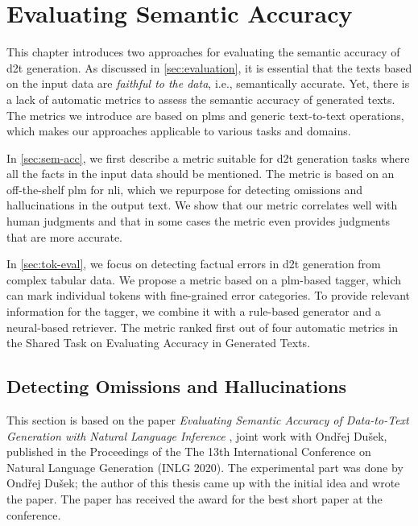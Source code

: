 
\chapter{Evaluating Semantic Accuracy}
\label{chap:evaluation}


This chapter introduces two approaches for evaluating the semantic accuracy of \ac{d2t} generation. As discussed in \autoref{sec:evaluation}, it is essential that the texts based on the input data are \emph{faithful to the data}, i.e., semantically accurate. Yet, there is a lack of automatic metrics to assess the semantic accuracy of generated texts. The metrics we introduce are based on \acp{plm} and generic text-to-text operations, which makes our approaches applicable to various tasks and domains.

In \autoref{sec:sem-acc}, we first describe a metric suitable for \ac{d2t} generation tasks where all the facts in the input data should be mentioned. The metric is based on an off-the-shelf \ac{plm} for \ac{nli}, which we repurpose for detecting omissions and hallucinations in the output text. We show that our metric correlates well with human judgments and that in some cases the metric even provides judgments that are more accurate.

In \autoref{sec:tok-eval}, we focus on detecting factual errors in \ac{d2t} generation from complex tabular data. We propose a metric based on a \ac{plm}-based tagger, which can mark individual tokens with fine-grained error categories. To provide relevant information for the tagger, we combine it with a rule-based generator and a neural-based retriever. The metric ranked first out of four automatic metrics in the Shared Task on Evaluating Accuracy in Generated Texts.

\section{Detecting Omissions and Hallucinations}
\label{sec:sem-acc}

\begin{refbox}
    This section is based on the paper \emph{Evaluating Semantic Accuracy of Data-to-Text Generation with Natural Language Inference} \cite{dusekEvaluatingSemanticAccuracy2020}, joint work with Ondřej Dušek, published in the Proceedings of the The 13th International Conference on Natural Language Generation (INLG 2020). The experimental part was done by Ondřej Dušek; the author of this thesis came up with the initial idea and wrote the paper. The paper has received the award for the best short paper at the conference.
\end{refbox}

